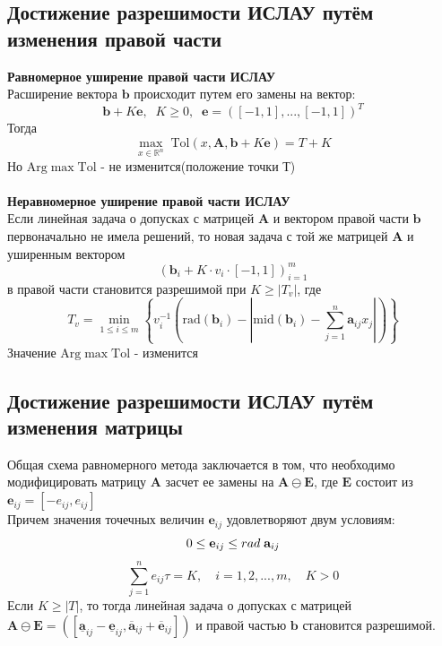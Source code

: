\documentclass[a4paper,14pt]{article}
\begin{document}
	\subsection{Достижение разрешимости ИСЛАУ путём изменения правой части}
	\textbf{Равномерное уширение правой части
		ИСЛАУ}\\
	Расширение вектора $\textbf{b}$ происходит путем его замены на вектор: 
	\begin{equation}
		\textbf{b}+K\textbf{e}, \;\; K\geq 0, \;\; \textbf{e}=([-1, 1],...,[-1, 1])^T
	\end{equation}
	Тогда
	\begin{equation}
		\max_{x\in \mathbb{R}^n} \;\mathrm{Tol}(x, \mathbf{A},\mathbf{b}+K\textbf{e}) = T + K
	\end{equation}
	Но $\mathrm{Arg}\max\mathrm{Tol}$ - не изменится(положение точки Т) \\
	\\
	\textbf{Неравномерное уширение правой части
		ИСЛАУ}\\
	Если линейная задача о допусках с матрицей $\textbf{A}$ и вектором правой части $\textbf{b}$ первоначально не имела решений, то новая задача с той же матрицей  $\textbf{A}$ и уширенным вектором
	\begin{equation}
		(\textbf{b}_i+K\cdot v_i\cdot [-1,1])_{i=1}^m
	\end{equation}
	в правой части становится разрешимой при $K\geq |T_v|$, где
	\begin{equation}
		T_v=\min_{1\leq i\leq m}\left\{v_i^{-1}\left(\mathrm{rad}(\mathbf{b}_i)-\left|\mathrm{mid}(\mathbf{b}_i)-\sum_{j=1}^n \mathbf{a}_{ij}x_j\right|\right)\right\}
	\end{equation}
	Значение $\mathrm{Arg}\max\mathrm{Tol}$ -  изменится
	\subsection{Достижение разрешимости ИСЛАУ путём изменения матрицы}
	Общая схема равномерного метода заключается в том, что необходимо модифицировать матрицу $\textbf{A}$ засчет ее замены на $\mathbf{A}\ominus \mathbf{E}$, где 
	$\mathbf{E}$ состоит из $\mathbf{e}_{ij}=[-e_{ij}, e_{ij}]$ \\
	Причем значения точечных величин $\mathbf{e}_{ij}$ удовлетворяют двум условиям:
	\begin{equation}
		0 \leq \mathbf{e}_{ij} \leq rad{\;\mathbf{a}_{ij}} \\
	\end{equation}
	\begin{equation}
		\sum_{j=1}^n e_{ij}\tau=K, \quad i=1,2,...,m, \quad K>0
	\end{equation}
	Если $K\geq |T|$, то тогда линейная задача о допусках с матрицей $\mathbf{A}\ominus\mathbf{E}=([\underline{\mathbf{a}}_{ij}-\underline{\mathbf{e}}_{ij},\overline{\mathbf{a}}_{ij}+\overline{\mathbf{e}}_{ij}])$ и правой частью $\textbf{b}$ становится разрешимой.
\end{document}
